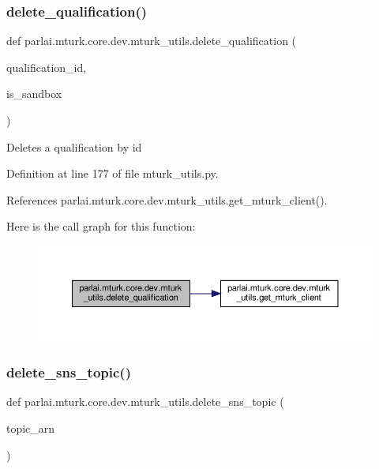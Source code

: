 \subsubsection{\texorpdfstring{delete\+\_\+qualification()}{delete\_qualification()}}
{\footnotesize\ttfamily def parlai.\+mturk.\+core.\+dev.\+mturk\+\_\+utils.\+delete\+\_\+qualification (\begin{DoxyParamCaption}\item[{}]{qualification\+\_\+id,  }\item[{}]{is\+\_\+sandbox }\end{DoxyParamCaption})}

\begin{DoxyVerb}Deletes a qualification by id\end{DoxyVerb}
 

Definition at line 177 of file mturk\+\_\+utils.\+py.



References parlai.\+mturk.\+core.\+dev.\+mturk\+\_\+utils.\+get\+\_\+mturk\+\_\+client().

Here is the call graph for this function\+:
\nopagebreak
\begin{figure}[H]
\begin{center}
\leavevmode
\includegraphics[width=350pt]{namespaceparlai_1_1mturk_1_1core_1_1dev_1_1mturk__utils_a1a4243aaafd94de8087e0d6ae06ad45c_cgraph}
\end{center}
\end{figure}
\mbox{\label{namespaceparlai_1_1mturk_1_1core_1_1dev_1_1mturk__utils_aa321f5dc5e9700bc3906fca85490e25e}} 
\subsubsection{\texorpdfstring{delete\+\_\+sns\+\_\+topic()}{delete\_sns\_topic()}}
{\footnotesize\ttfamily def parlai.\+mturk.\+core.\+dev.\+mturk\+\_\+utils.\+delete\+\_\+sns\+\_\+topic (\begin{DoxyParamCaption}\item[{}]{topic\+\_\+arn }\end{DoxyParamCaption})}



